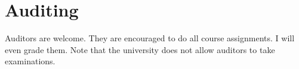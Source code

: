\section*{Auditing}

Auditors are welcome. They are encouraged to do all course assignments. I will even grade them. Note that the university does not allow auditors to take examinations.